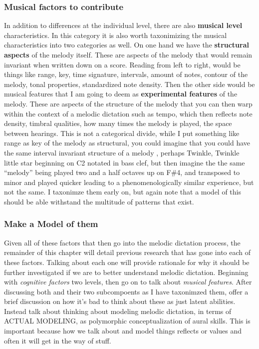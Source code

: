 \documentclass[]{book}
\theoremstyle{definition}
\theoremstyle{definition}
\theoremstyle{definition}
\theoremstyle{remark}
\begin{document}
\hypertarget{musical-factors-to-contribute}{%
\subsubsection{Musical factors to
contribute}\label{musical-factors-to-contribute}}

In addition to differences at the individual level, there are also
\textbf{musical level} characteristics. In this category it is also
worth taxonimizing the musical characteristics into two categories as
well. On one hand we have the \textbf{structural aspects} of the melody
itself. These are aspects of the melody that would remain invariant when
written down on a score. Reading from left to right, would be things
like range, key, time signature, intervals, amount of notes, contour of
the melody, tonal properties, standardized note density. Then the other
side would be musical features that I am going to deem as
\textbf{experimental features} of the melody. These are aspects of the
structure of the melody that you can then warp within the context of a
melodic dictation such as tempo, which then reflects note density,
timbral qualities, how many times the melody is played, the space
between hearings. This is not a categorical divide, while I put
something like range as key of the melody as structural, you could
imagine that you could have the same interval invariant structure of a
melody , perhaps Twinkle, Twinkle little star beginning on C2 notated in
bass clef, but then imagine the the same ``melody'' being played two and
a half octaves up on F\#4, and transposed to minor and played quicker
leading to a phenomenologically similar experience, but not the same. I
taxonimze them early on, but again note that a model of this should be
able withstand the multitude of patterns that exist.

\hypertarget{make-a-model-of-them}{%
\subsubsection{Make a Model of them}\label{make-a-model-of-them}}

Given all of these factors that then go into the melodic dictation
process, the remainder of this chapter will detail previous research
that has gone into each of these factors. Talking about each one will
provide rationale for why it should be further investigated if we are to
better understand melodic dictation. Beginning with \emph{cognitive
factors} two levels, then go on to talk about \emph{musical features}.
After discussing both and their two subcompoents as I have taxonimzed
them, offer a brief discussion on how it's bad to think about these as
just latent abilities. Instead talk about thinking about modeling
melodic dictation, in terms of ACTUAL MODELING, as polymorphic
conceptualization of aural skills. This is important because how we talk
about and model things reflects or values and often it will get in the
way of stuff.
\end{document}
